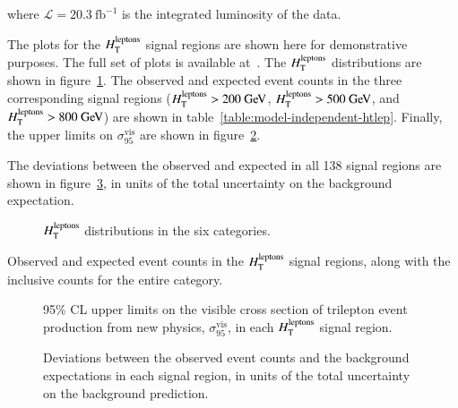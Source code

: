 where $\mathcal{L}=20.3~\mbox{fb}^{-1}$ is the integrated luminosity of the data.

The plots for the $H_{\mathrm{T}}^{\mathrm{leptons}}$ signal regions are shown here for demonstrative purposes. The full set of plots is available at~\cite{model-independent-webpage}. The $H_{\mathrm{T}}^{\mathrm{leptons}}$ distributions are shown in figure~\ref{fig:model-independent-htlep}. The observed and expected event counts in the three corresponding signal regions ($\htlep>200 \GeV$, $\htlep>500 \GeV$, and $\htlep>800 \GeV$) are shown in table~\ref{table:model-independent-htlep}. Finally, the upper limits on $\sigma_{95}^{\mathrm{vis}}$ are shown in figure~\ref{fig:model-independent-htlep-sigmavis}. 

The deviations between the observed and expected in all 138 signal regions are shown in figure~\ref{fig:model-independent-summary-sigma}, in units of the total uncertainty on the background expectation. 

\begin{figure}[htbp]
	\centering

	\caption{$H_{\mathrm{T}}^{\mathrm{leptons}}$ distributions in the six categories.}
	\label{fig:model-independent-htlep}
\end{figure}

\begin{table}[htbp]
	\centering

	\caption{Observed and expected event counts in the $H_{\mathrm{T}}^{\mathrm{leptons}}$ signal regions, along with the inclusive counts for the entire category.}
	\label{table:model-independent-htlep}
\end{table}

\begin{figure}
	\centering

	\caption{95\% CL upper limits on the visible cross section of trilepton event production from new physics, $\sigma_{95}^{\mathrm{vis}}$, in each $H_{\mathrm{T}}^{\mathrm{leptons}}$ signal region. }
	\label{fig:model-independent-htlep-sigmavis}
\end{figure}

\begin{figure}
	\centering

	\caption{Deviations between the observed event counts and the background expectations in each signal region, in units of the total uncertainty on the background prediction.}
	\label{fig:model-independent-summary-sigma}
\end{figure}



